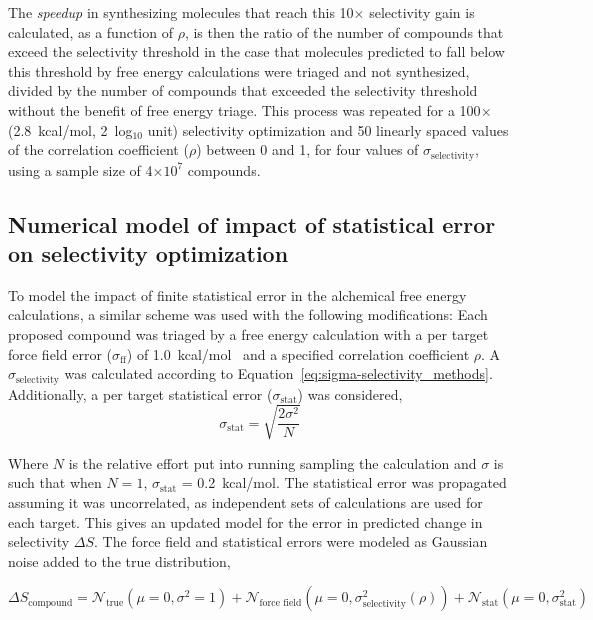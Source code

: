 \documentclass[phd,tocprelim]{cornell}
\begin{document}
The \emph{speedup} in synthesizing molecules that reach this 10$\times$ selectivity gain is calculated, as a function of $\rho$, is then the ratio of the number of compounds that exceed the selectivity threshold in the case that molecules predicted to fall below this threshold by free energy calculations were triaged and not synthesized, divided by the number of compounds that exceeded the selectivity threshold without the benefit of free energy triage.
This process was repeated for a 100$\times$ (2.8~kcal/mol, 2~log$_{10}$ unit) selectivity optimization and 50 linearly spaced values of the correlation coefficient ($\rho$) between 0 and 1, for four values of $\sigma_\text{selectivity}$, using a sample size of 4$\times10^7$ compounds. 

\subsection{Numerical model of impact of statistical error on selectivity optimization}

To model the impact of finite statistical error in the alchemical free energy calculations, a similar scheme was used with the following modifications:
Each proposed compound was triaged by a free energy calculation with a per target force field error ($\sigma_\text{ff}$) of 1.0~kcal/mol~\citep{Harder:J.Chem.TheoryComput.:2016}
and a specified correlation coefficient $\rho$.  
A $\sigma_\text{selectivity}$ was calculated according to Equation~\ref{eq:sigma-selectivity_methods}. 
Additionally, a per target statistical error ($\sigma_\text{stat}$) was considered, 
\begin{equation}\label{eq15}
\sigma_\text{stat} = \sqrt{\frac{2\sigma^2}{N}}
\end{equation}

Where $N$ is the relative effort put into running sampling the calculation and $\sigma$ is such that when $N = 1$, $\sigma_\text{stat}$ = 0.2~kcal/mol. 
The statistical error was propagated assuming it was uncorrelated, as independent sets of calculations are used for each target. This gives an updated model for the error in predicted change in selectivity $\Delta S$. The force field and statistical errors were modeled as Gaussian noise added to the true distribution, 

\begin{equation}\label{stat_error}
\Delta S_\text{compound} = \mathcal{N}_\text{true}(\mu =0, \sigma^2 = 1) + \mathcal{N}_\text{force field}(\mu =0, \sigma_\text{selectivity}^2(\rho)) + \mathcal{N}_\text{stat}(\mu =0, \sigma_\text{stat}^2)
\end{equation}
\end{document}
